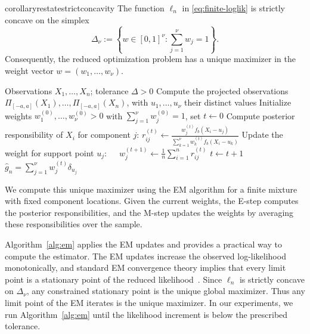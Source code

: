\documentclass[english, 11pt]{article}
\theoremstyle{plain}
\theoremstyle{definition}
\theoremstyle{remark}
\begin{document}
\begin{restatable}{corollary}{restatestrictconcavity}\label{cor:strict-concavity}
The function $\ell_n$ in \eqref{eq:finite-loglik} is strictly concave on the simplex
\begin{equation*}
\Delta_\nu:=\left\{w\in[0,1]^\nu:\sum_{j=1}^\nu w_j=1\right\}.
\end{equation*}
Consequently, the reduced optimization problem has a unique maximizer in the weight vector $w=(w_1,\dots,w_\nu)$.
\end{restatable}

\begin{algorithm}[t]
\caption{EM algorithm for the NPMLE under the Laplace convolution model}
\label{alg:em}
\begin{algorithmic}[1]
\Require Observations $X_1,\dots,X_n$;
tolerance $\Delta>0$
\State Compute the projected observations $\Pi_{[-a,a]}(X_1),\dots,\Pi_{[-a,a]}(X_n)$, with $u_1,\dots,u_{\nu}$ their distinct values
\State Initialize weights $w_1^{(0)},\dots,w_{\nu}^{(0)}>0$ with $\sum_{j=1}^{\nu} w_j^{(0)}=1$, set $t\gets 0$
\Repeat
{}
\State Compute posterior responsibility of $X_i$ for component $j$: \quad
\(
r_{ij}^{(t)}
\gets
\frac{w_j^{(t)} f_b(X_i-u_j)}
{\sum_{k=1}^{\nu} w_k^{(t)} f_b(X_i-u_k)}
\)
\EndFor
{}
\State Update the weight for support point $u_j: \quad$
\(w_j^{(t+1)}
\gets
\frac{1}{n}\sum_{i=1}^n r_{ij}^{(t)}
\)
\EndFor
\State $t\gets t+1$
\State \Return $\widehat g_n=\sum_{j=1}^{\nu} w_j^{(t)}\delta_{u_j}$
\end{algorithmic}
\end{algorithm}

We compute this unique maximizer using the EM algorithm for a finite mixture with fixed component locations.
Given the current weights, the E-step computes the posterior responsibilities, and the M-step updates the weights by averaging these responsibilities over the sample.

Algorithm~\ref{alg:em} applies the EM updates and provides a practical way to compute the estimator.
The EM updates increase the observed log-likelihood monotonically, and standard EM convergence theory implies that every limit point is a stationary point of the reduced likelihood~\citep{dempster1977maximum,wu1983convergence}. 
Since $\ell_n$ is strictly concave on $\Delta_\nu$, any constrained stationary point is the unique global maximizer.
Thus any limit point of the EM iterates is the unique maximizer.
In our experiments, we run Algorithm~\ref{alg:em} until the likelihood increment is below the prescribed tolerance.
\end{document}
